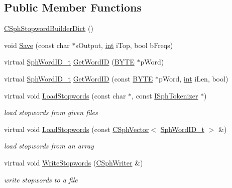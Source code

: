 \subsection*{Public Member Functions}
\begin{DoxyCompactItemize}
\item 
\hyperlink{classCSphStopwordBuilderDict_ae2f88f5736d781cc5d3015ab6769734a}{C\-Sph\-Stopword\-Builder\-Dict} ()
\item 
void \hyperlink{classCSphStopwordBuilderDict_ae00cbb4ad3917b204ca9d15dcfc7fc05}{Save} (const char $\ast$s\-Output, \hyperlink{sphinxexpr_8cpp_a4a26e8f9cb8b736e0c4cbf4d16de985e}{int} i\-Top, bool b\-Freqs)
\item 
virtual \hyperlink{sphinx_8h_a80a94d5984fdf9214a98f3e5e65df963}{Sph\-Word\-I\-D\-\_\-t} \hyperlink{classCSphStopwordBuilderDict_a998d9bcac7c3d0da70cd3fbbb01ce121}{Get\-Word\-I\-D} (\hyperlink{sphinxstd_8h_a4ae1dab0fb4b072a66584546209e7d58}{B\-Y\-T\-E} $\ast$p\-Word)
\item 
virtual \hyperlink{sphinx_8h_a80a94d5984fdf9214a98f3e5e65df963}{Sph\-Word\-I\-D\-\_\-t} \hyperlink{classCSphStopwordBuilderDict_aeed0ca13f7e81f69296ab7619306a673}{Get\-Word\-I\-D} (const \hyperlink{sphinxstd_8h_a4ae1dab0fb4b072a66584546209e7d58}{B\-Y\-T\-E} $\ast$p\-Word, \hyperlink{sphinxexpr_8cpp_a4a26e8f9cb8b736e0c4cbf4d16de985e}{int} i\-Len, bool)
\item 
virtual void \hyperlink{classCSphStopwordBuilderDict_a808d73e57b0532e6a860dc4fbf18db61}{Load\-Stopwords} (const char $\ast$, const \hyperlink{classISphTokenizer}{I\-Sph\-Tokenizer} $\ast$)
\begin{DoxyCompactList}\small\item\em load stopwords from given files \end{DoxyCompactList}\item 
virtual void \hyperlink{classCSphStopwordBuilderDict_a8f9a35477cf204e1c6d49f63bb5fcdbd}{Load\-Stopwords} (const \hyperlink{classCSphVector}{C\-Sph\-Vector}$<$ \hyperlink{sphinx_8h_a80a94d5984fdf9214a98f3e5e65df963}{Sph\-Word\-I\-D\-\_\-t} $>$ \&)
\begin{DoxyCompactList}\small\item\em load stopwords from an array \end{DoxyCompactList}\item 
virtual void \hyperlink{classCSphStopwordBuilderDict_ab68b8f8dfcbe17698a6b5bf9e9a4f9f9}{Write\-Stopwords} (\hyperlink{classCSphWriter}{C\-Sph\-Writer} \&)
\begin{DoxyCompactList}\small\item\em write stopwords to a file \end{DoxyCompactList}\item 

\end{DoxyCompactItemize}
